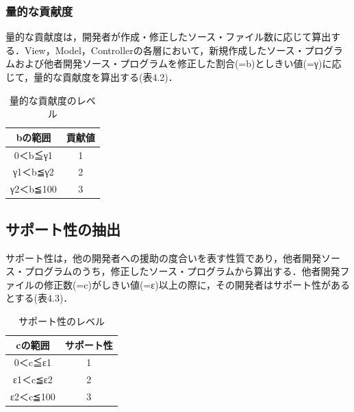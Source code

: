 \documentclass{funthesis}
\begin{document}
\subsubsection{量的な貢献度}
量的な貢献度は，開発者が作成・修正したソース・ファイル数に応じて算出する．View，Model，Controllerの各層において，新規作成したソース・プログラムおよび他者開発ソース・プログラムを修正した割合(=b)としきい値(=γ)に応じて，量的な貢献度を算出する(表4.2)．
\begin{table}[H]
  \begin{center}
    \begin{tabular}{|c||c|} \hline
      bの範囲 & 貢献値  \\ \hline
      0＜b≦γ1 & 1 \\ \hline
      γ1＜b≦γ2 & 2 \\ \hline
      γ2＜b≦100 & 3  \\ \hline
    \end{tabular}
  \end{center}
  \caption{量的な貢献度のレベル}    \label{sample}
\end{table}

\subsection{サポート性の抽出}
サポート性は，他の開発者への援助の度合いを表す性質であり，他者開発ソース・プログラムのうち，修正したソース・プログラムから算出する．他者開発ファイルの修正数(=c)がしきい値(=ε)以上の際に，その開発者はサポート性があるとする(表4.3)．
\begin{table}[H]
  \begin{center}
    \begin{tabular}{|c||c|} \hline
      cの範囲 & サポート性  \\ \hline
      0＜c≦ε1 & 1 \\ \hline
      ε1＜c≦ε2 & 2 \\ \hline
      ε2＜c≦100 & 3  \\ \hline
    \end{tabular}
  \end{center}
  \caption{サポート性のレベル}    \label{sample}
\end{table}
\end{document}
